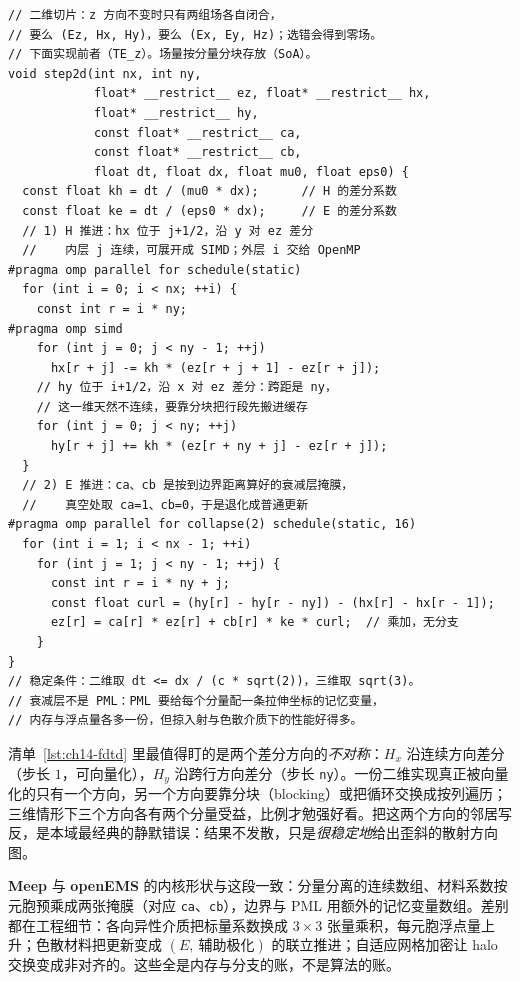 \documentclass[12pt,a4paper,fontset=fandol]{ctexbook}
\newcommand{\Tp}[1]{\texttt{#1}}
\newcommand{\Lib}[1]{\textbf{#1}}
\begin{document}
\begin{lstlisting}[style=cppstyle,label={lst:ch14-fdtd},caption={二维 FDTD 的 leapfrog 更新：Yee 交错、衰减层与向量化提示}]
// 二维切片：z 方向不变时只有两组场各自闭合，
// 要么 (Ez, Hx, Hy)，要么 (Ex, Ey, Hz)；选错会得到零场。
// 下面实现前者（TE_z）。场量按分量分块存放（SoA）。
void step2d(int nx, int ny,
            float* __restrict__ ez, float* __restrict__ hx,
            float* __restrict__ hy,
            const float* __restrict__ ca,
            const float* __restrict__ cb,
            float dt, float dx, float mu0, float eps0) {
  const float kh = dt / (mu0 * dx);      // H 的差分系数
  const float ke = dt / (eps0 * dx);     // E 的差分系数
  // 1) H 推进：hx 位于 j+1/2，沿 y 对 ez 差分
  //    内层 j 连续，可展开成 SIMD；外层 i 交给 OpenMP
#pragma omp parallel for schedule(static)
  for (int i = 0; i < nx; ++i) {
    const int r = i * ny;
#pragma omp simd
    for (int j = 0; j < ny - 1; ++j)
      hx[r + j] -= kh * (ez[r + j + 1] - ez[r + j]);
    // hy 位于 i+1/2，沿 x 对 ez 差分：跨距是 ny，
    // 这一维天然不连续，要靠分块把行段先搬进缓存
    for (int j = 0; j < ny; ++j)
      hy[r + j] += kh * (ez[r + ny + j] - ez[r + j]);
  }
  // 2) E 推进：ca、cb 是按到边界距离算好的衰减层掩膜，
  //    真空处取 ca=1、cb=0，于是退化成普通更新
#pragma omp parallel for collapse(2) schedule(static, 16)
  for (int i = 1; i < nx - 1; ++i)
    for (int j = 1; j < ny - 1; ++j) {
      const int r = i * ny + j;
      const float curl = (hy[r] - hy[r - ny]) - (hx[r] - hx[r - 1]);
      ez[r] = ca[r] * ez[r] + cb[r] * ke * curl;  // 乘加，无分支
    }
}
// 稳定条件：二维取 dt <= dx / (c * sqrt(2))，三维取 sqrt(3)。
// 衰减层不是 PML：PML 要给每个分量配一条拉伸坐标的记忆变量，
// 内存与浮点量各多一份，但掠入射与色散介质下的性能好得多。
\end{lstlisting}

清单~\ref{lst:ch14-fdtd} 里最值得盯的是两个差分方向的\emph{不对称}：$H_x$ 沿连续方向差分（步长 $1$，可向量化），$H_y$ 沿跨行方向差分（步长 \Tp{ny}）。一份二维实现真正被向量化的只有一个方向，另一个方向要靠分块（blocking）或把循环交换成按列遍历；三维情形下三个方向各有两个分量受益，比例才勉强好看。把这两个方向的邻居写反，是本域最经典的静默错误：结果不发散，只是\emph{很稳定地}给出歪斜的散射方向图。

\Lib{Meep} 与 \Lib{openEMS} 的内核形状与这段一致：分量分离的连续数组、材料系数按元胞预乘成两张掩膜（对应 \Tp{ca}、\Tp{cb}），边界与 PML 用额外的记忆变量数组。差别都在工程细节：各向异性介质把标量系数换成 $3\times 3$ 张量乘积，每元胞浮点量上升；色散材料把更新变成 $(E,\ \text{辅助极化})$ 的联立推进；自适应网格加密让 halo 交换变成非对齐的。这些全是内存与分支的账，不是算法的账。
\end{document}
